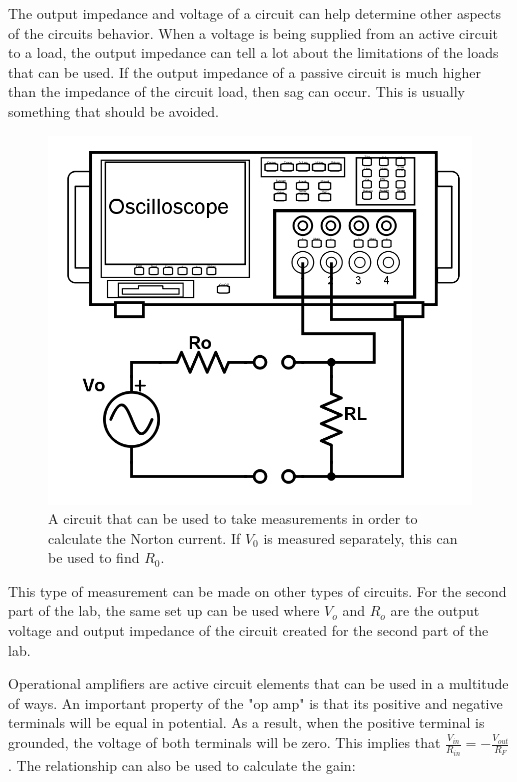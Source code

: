 \documentclass[twocolumn, amsmath]{revtex4}
\begin{document}
The output impedance and voltage of a circuit can help determine other aspects of the circuits behavior. 
When a voltage is being supplied from an active circuit to a load, the output impedance can tell a lot about the limitations of the loads that can be used. 
If the output impedance of a passive circuit is much higher than the impedance of the circuit load, then sag can occur. This is usually something that should be avoided.

\begin{figure}[h]
    \includegraphics[scale=0.25]{output.png}  
    \caption{A circuit that can be used to take measurements in order to calculate the Norton current. If $V_0$ is measured separately, this can be used to find $R_0$.}
\end{figure}

This type of measurement can be made on other types of circuits. For the second part of the lab, the same set up can be used where $V_{o}$ and $R_{o}$ are the output voltage and output impedance of the circuit created for the second part of the lab.

Operational amplifiers are active circuit elements that can be used in a multitude of ways. An important property of the "op amp" is that its positive and negative terminals will be equal in potential. As a result, when the positive terminal is grounded, the voltage of both terminals will be zero. This implies that $\frac{V_{in}}{R_{in}} = -\frac{V_{out}}{R_{F}}$. The relationship can also be used to calculate the gain:
\end{document}
